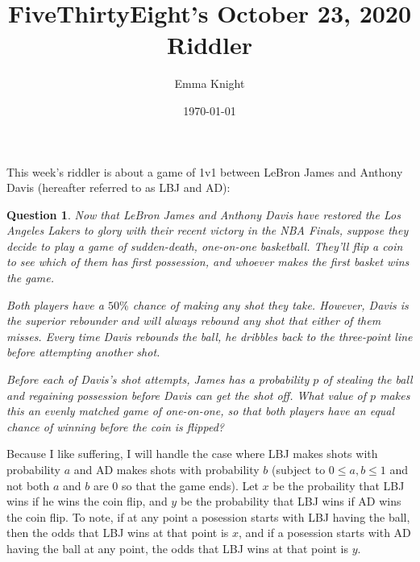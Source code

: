 \documentclass[11pt]{article}
\title{FiveThirtyEight's October 23, 2020 Riddler}
\author{Emma Knight}
\date{\today}
\newtheorem{question}[theorem]{Question}
\theoremstyle{definition}
\begin{document}
\maketitle
This week's riddler is about a game of 1v1 between LeBron James and Anthony Davis (hereafter referred to as LBJ and AD):
\begin{question}
Now that LeBron James and Anthony Davis have restored the Los Angeles Lakers to glory with their recent victory in the NBA Finals, suppose they decide to play a game of sudden-death, one-on-one basketball. They’ll flip a coin to see which of them has first possession, and whoever makes the first basket wins the game.

Both players have a $50\%$ chance of making any shot they take. However, Davis is the superior rebounder and will always rebound any shot that either of them misses. Every time Davis rebounds the ball, he dribbles back to the three-point line before attempting another shot.

Before each of Davis’s shot attempts, James has a probability $p$ of stealing the ball and regaining possession before Davis can get the shot off. What value of $p$ makes this an evenly matched game of one-on-one, so that both players have an equal chance of winning \emph{before} the coin is flipped?
\end{question}
Because I like suffering, I will handle the case where LBJ makes shots with probability $a$ and AD makes shots with probability $b$ (subject to $0\leq a, b \leq 1$ and not both $a$ and $b$ are $0$ so that the game ends).  Let $x$ be the probaility that LBJ wins if he wins the coin flip, and $y$ be the probability that LBJ wins if AD wins the coin flip.  To note, if at any point a posession starts with LBJ having the ball, then the odds that LBJ wins at that point is $x$, and if a posession starts with AD having the ball at any point, the odds that LBJ wins at that point is $y$.
\end{document}
